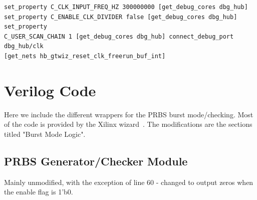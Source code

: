 \documentclass[oneside]{discothesis}
\begin{document}
\begin{verbatim}
set_property C_CLK_INPUT_FREQ_HZ 300000000 [get_debug_cores dbg_hub]
set_property C_ENABLE_CLK_DIVIDER false [get_debug_cores dbg_hub] set_property
C_USER_SCAN_CHAIN 1 [get_debug_cores dbg_hub] connect_debug_port dbg_hub/clk
[get_nets hb_gtwiz_reset_clk_freerun_buf_int]
\end{verbatim}

\chapter{Verilog Code}%
\label{cha:verilog_code}
Here we include the different wrappers for the PRBS burst mode/checking. 
Most of the code is provided by the Xilinx wizard~\cite{wizard_guide}. The
modifications are the sections titled "Burst Mode Logic".

\section{PRBS Generator/Checker Module}%
\label{sec:prbs_generator_checker_module}
Mainly unmodified, with the exception of line 60 - changed to output zeros when
the enable flag is 1'b0.
\end{document}
